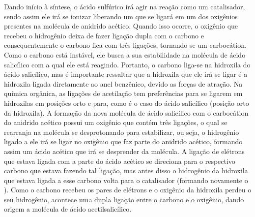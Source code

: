 Dando início à síntese, o ácido sulfúrico irá agir na reação como um catalisador, sendo assim ele
irá se ionizar liberando um  que se ligará em um dos oxigênios presentes na molécula de
anidrido acético. Quando isso ocorre, o oxigênio que recebeu o hidrogênio deixa de fazer ligação
dupla com o carbono e consequentemente o carbono fica com três ligações, tornando-se um carbocátion.
Como o carbono está instável, ele busca a sua estabilidade na molécula de ácido salicílico com a
qual ele está reagindo. Portanto, o carbono liga-se na hidroxila do ácido salicílico, mas é
importante ressaltar que a hidroxila que ele irá se ligar é a hidroxila ligada diretamente ao anel
benzênico, devido as forças de atração. Na química orgânica, as ligações de acetilação tem
preferências para se ligarem em hidroxilas em posições orto e para, como é o caso do ácido
salicílico (posição orto da hidroxila). A formação da nova molécula de ácido salicílico com o
carbocátion do anidrido acético possui um oxigênio que contém três ligações, o qual se rearranja na
molécula se desprotonando para estabilizar, ou seja, o hidrogênio ligado a ele irá se ligar no
oxigênio que faz parte do anidrido acético, formando assim um ácido acético que irá se desprender da
molécula. A ligação de elétrons que estava ligada com a parte do ácido acético se direciona para o
respectivo carbono que estava fazendo tal ligação, mas antes disso o hidrogênio da hidroxila que
estava ligada a esse carbono volta para o catalisador (formando novamente o ). Como o
carbono recebeu os pares de elétrons e o oxigênio da hidroxila perdeu o seu hidrogênio, acontece uma
dupla ligação entre o carbono e o oxigênio, dando origem a molécula de ácido acetilsalicílico.


\newpage

